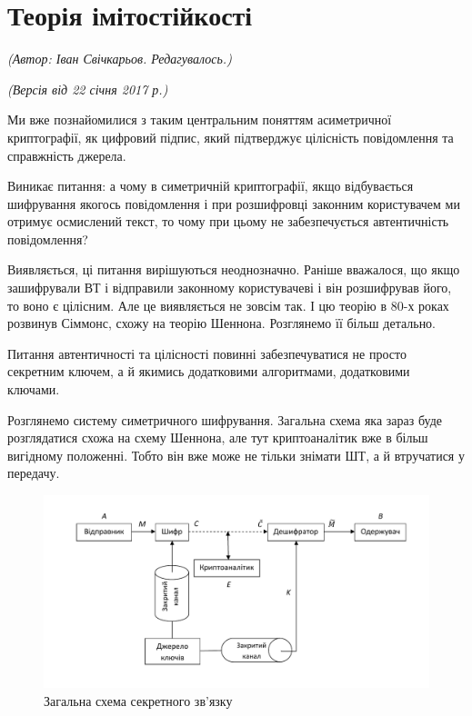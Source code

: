 \section{Теорія імітостійкості}
\begin{flushright}
\emph{(Автор: Іван Свічкарьов. Редагувалось.)}
\par \emph{(Версія від 22 січня 2017 р.)}
\end{flushright}

Ми вже познайомилися з таким центральним поняттям асиметричної криптографії, як цифровий підпис, який підтверджує цілісність повідомлення та справжність джерела. \par
Виникає питання: а чому в симетричній криптографії, якщо відбувається шифрування якогось повідомлення і при розшифровці законним користувачем ми отримує осмислений текст, то чому при цьому не забезпечується автентичність повідомлення? \par
 Виявляється, ці питання вирішуються неоднозначно. Раніше вважалося, що якщо зашифрували ВТ і відправили законному користувачеві і він розшифрував його, то воно є цілісним. Але це виявляється не зовсім так. І цю теорію в 80-х роках розвинув Сіммонс, схожу на теорію Шеннона. Розглянемо її більш детально. \par
Питання автентичності та цілісності повинні забезпечуватися не просто секретним ключем, а й якимись додатковими алгоритмами, додатковими ключами. \par
Розглянемо систему симетричного шифрування. Загальна схема яка зараз буде розглядатися схожа на схему Шеннона, але тут криптоаналітик вже в більш вигідному положенні. Тобто він вже може не тільки знімати ШТ, а й втручатися у передачу.

\begin{figure}[h]
\includegraphics[width=\textwidth]{scheme}
\caption{Загальна схема секретного зв'язку}
\label{im:S_scheme}
\end{figure} 


